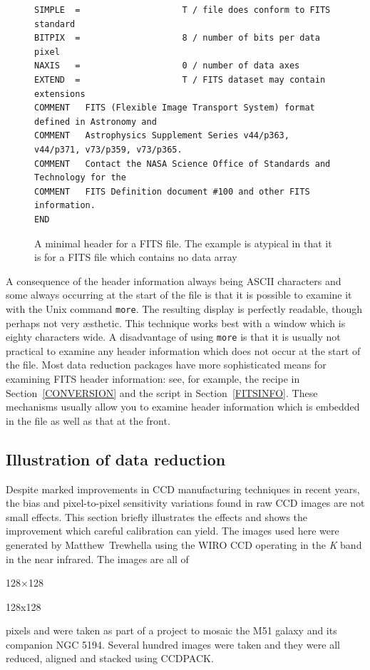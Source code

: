\documentclass[twoside,11pt]{article}
\begin{document}
\begin{figure}[htbp]

\begin{verbatim}
SIMPLE  =                    T / file does conform to FITS standard    
BITPIX  =                    8 / number of bits per data pixel    
NAXIS   =                    0 / number of data axes    
EXTEND  =                    T / FITS dataset may contain extensions    
COMMENT   FITS (Flexible Image Transport System) format defined in Astronomy and
COMMENT   Astrophysics Supplement Series v44/p363, v44/p371, v73/p359, v73/p365.
COMMENT   Contact the NASA Science Office of Standards and Technology for the   
COMMENT   FITS Definition document #100 and other FITS information.    
END                                                                       
\end{verbatim}

\begin{quote}
\caption[A minimal FITS file header]{A minimal header for a FITS
file.  The example is atypical in that it is for a FITS file which
contains no data array
\label{FITSHEAD} }
\end{quote}

\end{figure}

A consequence of the header information always being ASCII characters
and some always occurring at the start of the file is that it is possible
to examine it with the Unix command {\tt more}.  The resulting display is
perfectly readable, though perhaps not very \ae sthetic.  This technique
works best with a window which is eighty characters wide.  A disadvantage
of using {\tt more} is that it is usually not practical to examine any
header information which does not occur at the start of the file.  Most
data reduction packages have more sophisticated means for examining FITS
header information: see, for example, the recipe in Section~\ref{CONVERSION}
and the script in Section~\ref{FITSINFO}.  These mechanisms usually allow
you to examine header information which is embedded in the file as well
as that at the front.

\subsection{Illustration of data reduction}

Despite marked improvements in CCD manufacturing techniques in recent
years, the bias and pixel-to-pixel sensitivity variations found in raw
CCD images are not small effects.  This section briefly illustrates the
effects and shows the improvement which careful calibration can yield.
The images used here were generated by Matthew~Trewhella using the WIRO CCD
operating in the {\it K}\/ band in the near infrared.  The images are all of
\begin{latex} 
128$\times$128 
\end{latex}
\begin{htmlonly} 
128x128 
\end{htmlonly}
pixels and were taken as part of a project to mosaic the M51 galaxy
and its companion NGC 5194.  Several hundred images were taken and they were
all reduced, aligned and stacked using CCDPACK.
\end{document}
